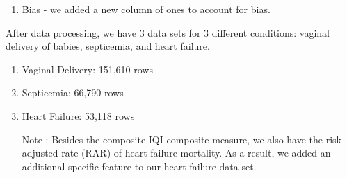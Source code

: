 \documentclass[letterpaper,11pt]{article}
\begin{document}
\begin{enumerate}
  \item Bias - we added a new column of ones to account for bias.
 \end{enumerate}   
 
    
 After data processing, we have 3 data sets for 3 different conditions: vaginal delivery of babies, septicemia, and heart failure. 
 \begin{enumerate}
 \item Vaginal Delivery: 151,610 rows
 
 \item Septicemia: 66,790 rows
 
 \item Heart Failure: 53,118 rows
 
 Note : Besides the composite IQI composite measure, we also have the risk adjusted rate (RAR) of heart failure mortality. As a result, we added an additional specific feature to our heart failure data set. 
 
\end{enumerate}
\end{document}
